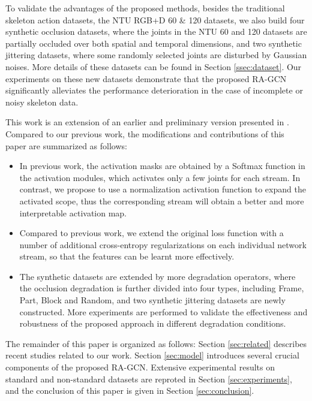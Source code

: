 \documentclass[journal]{IEEEtran}
\begin{document}
To validate the advantages of the proposed methods, besides the traditional skeleton action datasets, the NTU RGB+D 60 \cite{shahroudy2016ntu} \& 120 \cite{liu2019ntu} datasets, we also build four synthetic occlusion datasets, where the joints in the NTU 60 and 120 datasets are partially occluded over both spatial and temporal dimensions, and two synthetic jittering datasets, where some randomly selected joints are disturbed by Gaussian noises. More details of these datasets can be found in Section \ref{ssec:dataset}. Our experiments on these new datasets demonstrate that the proposed RA-GCN significantly alleviates the performance deterioration in the case of incomplete or noisy skeleton data.

This work is an extension of an earlier and preliminary version presented in \cite{song2019richly}. Compared to our previous work, the modifications and contributions of this paper are summarized as follows:
\begin{itemize}
    \item In previous work, the activation masks are obtained by a Softmax function in the activation modules, which activates only a few joints for each stream. In contrast, we propose to use a normalization activation function to expand the activated scope, thus the corresponding stream will obtain a better and more interpretable activation map.
    \item Compared to previous work, we extend the original loss function with a number of additional cross-entropy regularizations on each individual network stream, so that the features can be learnt more effectively.
    \item The synthetic datasets are extended by more degradation operators, where the occlusion degradation is further divided into four types, including Frame, Part, Block and Random, and two synthetic jittering datasets are newly constructed. More experiments are performed to validate the effectiveness and robustness of the proposed approach in different degradation conditions.
\end{itemize}

The remainder of this paper is organized as follows: Section \ref{sec:related} describes recent studies related to our work. Section \ref{sec:model} introduces several crucial components of the proposed RA-GCN. Extensive experimental results on standard and non-standard datasets are reproted in Section \ref{sec:experiments}, and the conclusion of this paper is given in Section \ref{sec:conclusion}.
\end{document}
